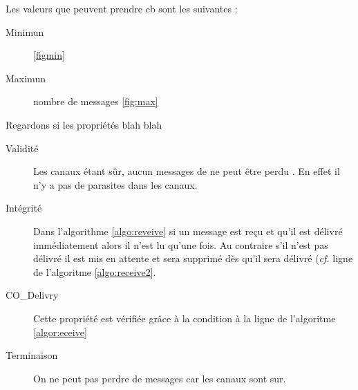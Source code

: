 Les valeurs que peuvent prendre cb sont les suivantes :

\begin{description}
\item[Minimun]
\ref{figmin}
\item[Maximun]
nombre de messages
\ref{fig:max}
\end{description}

Regardons si les propriétés blah blah 

\begin{description}
\item[Validité] Les canaux étant sûr, aucun messages de ne peut être \og perdu \fg{}. En effet il n'y a pas de parasites dans les canaux.
\item[Intégrité] Dans l'algorithme \ref{algo:reveive} si un message est reçu et qu'il est délivré immédiatement alors il n'est lu qu'une fois. Au contraire s'il n'est pas délivré il est mis en attente et sera supprimé dès qu'il sera délivré (\emph{cf.} ligne  de l'algoritme \ref{algo:receive2}.
\item[CO\_Delivry] Cette propriété est vérifiée grâce à la condition à la ligne de l'algoritme \ref{algor:eceive}
\item[Terminaison] On ne peut pas perdre de messages car les canaux sont sur. 
\end{description}

